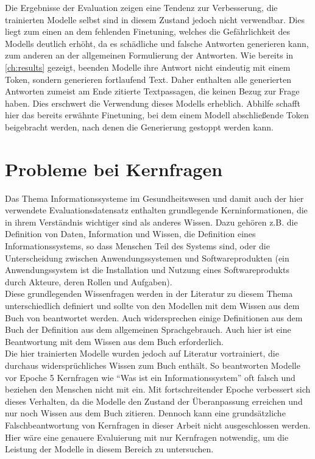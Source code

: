 Die Ergebnisse der Evaluation zeigen eine Tendenz zur Verbesserung, die trainierten Modelle selbst sind in diesem Zustand jedoch nicht verwendbar.
Dies liegt zum einen an dem fehlenden Finetuning, welches die Gefährlichkeit des Modells deutlich erhöht, da es schädliche und falsche Antworten generieren kann, zum anderen an der allgemeinen Formulierung der Antworten.
Wie bereits in \cref{ch:results} gezeigt, beenden Modelle ihre Antwort nicht eindeutig mit einem Token, sondern generieren fortlaufend Text.
Daher enthalten alle generierten Antworten zumeist am Ende zitierte Textpassagen, die keinen Bezug zur Frage haben.
Dies erschwert die Verwendung dieses Modells erheblich.
Abhilfe schafft hier das bereits erwähnte Finetuning, bei dem einem Modell abschließende Token beigebracht werden, nach denen die Generierung gestoppt werden kann.

\section{Probleme bei Kernfragen}
Das Thema Informationssysteme im Gesundheitswesen und damit auch der hier verwendete Evaluationsdatensatz enthalten grundlegende Kerninformationen,
die in ihrem Verständnis wichtiger sind als anderes Wissen. Dazu gehören z.B. die Definition von Daten, Information und Wissen, die Definition eines Informationssystems, so dass Menschen Teil des Systems sind, oder die Unterscheidung zwischen Anwendungssystemen und Softwareprodukten (ein Anwendungssystem ist die Installation und Nutzung eines Softwareprodukts durch Akteure, deren Rollen und Aufgaben).\\

Diese grundlegenden Wissenfragen werden in der Literatur zu diesem Thema unterschiedlich definiert und sollte von den Modellen mit dem Wissen aus dem Buch von \citet{bb} beantwortet werden.
Auch widersprechen einige Definitionen aus dem Buch der Definition aus dem allgemeinen Sprachgebrauch. Auch hier ist eine Beantwortung mit dem Wissen aus dem Buch erforderlich.\\

Die hier trainierten Modelle wurden jedoch auf Literatur vortrainiert, die durchaus widersprüchliches Wissen zum Buch enthält.
So beantworten Modelle vor Epoche 5 Kernfragen wie \enquote{Was ist ein Informationssystem} oft falsch und beziehen den Menschen nicht mit ein.
Mit fortschreitender Epoche verbessert sich dieses Verhalten, da die Modelle den Zustand der Überanpassung erreichen und nur noch Wissen aus dem Buch zitieren.
Dennoch kann eine grundsätzliche Falschbeantwortung von Kernfragen in dieser Arbeit nicht ausgeschlossen werden.
Hier wäre eine genauere Evaluierung mit nur Kernfragen notwendig, um die Leistung der Modelle in diesem Bereich zu untersuchen.\\

